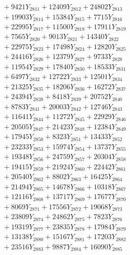 \documentclass[a4paper,10pt]{article}
\begin{document}
{\begin{align}
&\;  + 9421 Y_{2811} + 12409 Y_{2812} + 24802 Y_{2813} \\[0.3ex]
&\;  + 19903 Y_{2814} + 15384 Y_{2815} + 7715 Y_{2816} \\[0.3ex]
&\;  + 22995 Y_{2817} + 11500 Y_{2818} + 17911 Y_{2819} \\[0.5ex]\allowbreak
&\;  + 7565 Y_{2820} + 9013 Y_{2821} + 14340 Y_{2822} \\[0.3ex]
&\;  + 22975 Y_{2823} + 17498 Y_{2824} + 12820 Y_{2825} \\[0.3ex]
&\;  + 24416 Y_{2826} + 12379 Y_{2827} + 9733 Y_{2828} \\[0.3ex]
&\;  + 11954 Y_{2829} + 17840 Y_{2830} + 18533 Y_{2831} \\[0.3ex]
&\;  + 6497 Y_{2832} + 12722 Y_{2833} + 12501 Y_{2834} \\[0.3ex]
&\;  + 21325 Y_{2835} + 18206 Y_{2836} + 16272 Y_{2837} \\[0.3ex]
&\;  + 24394 Y_{2838} + 8418 Y_{2839} + 20752 Y_{2840} \\[0.3ex]
&\;  + 8783 Y_{2841} + 20003 Y_{2842} + 12746 Y_{2843} \\[0.3ex]
&\;  + 11641 Y_{2844} + 11272 Y_{2845} + 22929 Y_{2846} \\[0.3ex]
&\;  + 20505 Y_{2847} + 21423 Y_{2848} + 12384 Y_{2849} \\[0.5ex]\allowbreak
&\;  + 17945 Y_{2850} + 8323 Y_{2851} + 13433 Y_{2852} \\[0.3ex]
&\;  + 23233 Y_{2853} + 15974 Y_{2854} + 13737 Y_{2855} \\[0.3ex]
&\;  + 19348 Y_{2856} + 24759 Y_{2857} + 20304 Y_{2858} \\[0.3ex]
&\;  + 19415 Y_{2859} + 21924 Y_{2860} + 22442 Y_{2861} \\[0.3ex]
&\;  + 20540 Y_{2862} + 8802 Y_{2863} + 16425 Y_{2864} \\[0.3ex]
&\;  + 21494 Y_{2865} + 14678 Y_{2866} + 10318 Y_{2867} \\[0.3ex]
&\;  + 12116 Y_{2868} + 13717 Y_{2869} + 17677 Y_{2870} \\[0.3ex]
&\;  + 8069 Y_{2871} + 17556 Y_{2872} + 19068 Y_{2873} \\[0.3ex]
&\;  + 23809 Y_{2874} + 24862 Y_{2875} + 7823 Y_{2876} \\[0.3ex]
&\;  + 19319 Y_{2877} + 23835 Y_{2878} + 17984 Y_{2879} \\[0.5ex]\allowbreak
&\;  + 13138 Y_{2880} + 15167 Y_{2881} + 17203 Y_{2882} \\[0.3ex]
&\;  + 23516 Y_{2883} + 9887 Y_{2884} + 16090 Y_{2885} \\[0.3ex]

\end{align}}
\end{document}
